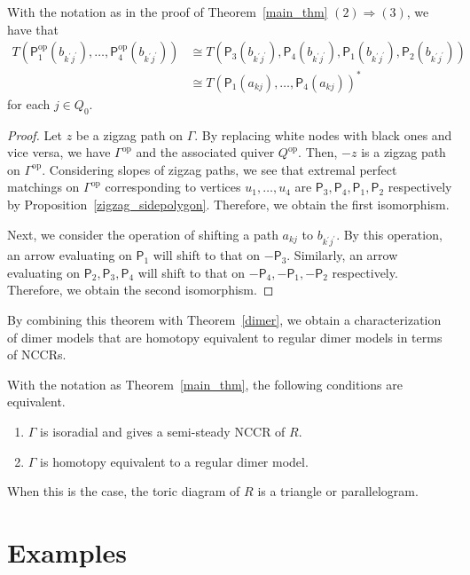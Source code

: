 \documentclass[ALCO,ThmDefs,Unicode]{cedram}
\newcommand{\sfP}{\mathsf{P}}
\DeclareMathOperator{\op}{op}
\begin{document}
\begin{lemm}\label{key_lem}
With the notation as in the proof of Theorem~\ref{main_thm} $(2)\Rightarrow(3)$, we have that
\begin{align*}
T(\sfP^{\op}_1(b_{k^\prime j^\prime}),\dots,\sfP^{\op}_4(b_{k^\prime j^\prime})) &\cong T(\sfP_3(b_{k^\prime j^\prime}),\sfP_4(b_{k^\prime j^\prime}),\sfP_1(b_{k^\prime j^\prime}),\sfP_2(b_{k^\prime j^\prime}))\\
&\cong T(\sfP_1(a_{kj}),\dots,\sfP_4(a_{kj}))^*
\end{align*}
for each $j\in Q_0$.
\end{lemm}

\begin{proof}
Let $z$ be a zigzag path on $\Gamma$. By replacing white nodes with black ones and vice versa, we have $\Gamma^{\op}$ and the associated quiver $Q^{\op}$. Then, $-z$ is a zigzag path on $\Gamma^{\op}$. Considering slopes of zigzag paths, we see that extremal perfect matchings on $\Gamma^{\op}$ corresponding to vertices $u_1,\dots,u_4$ are $\sfP_3, \sfP_4,\sfP_1,\sfP_2$ respectively by Proposition~\ref{zigzag_sidepolygon}. Therefore, we obtain the first isomorphism.

Next, we consider the operation of shifting a path $a_{kj}$ to $b_{k^\prime j^\prime}$. By this operation, an arrow evaluating on $\sfP_1$ will shift to that on $-\sfP_3$. Similarly, an arrow evaluating on $\sfP_2,\sfP_3,\sfP_4$ will shift to that on $-\sfP_4,-\sfP_1,-\sfP_2$ respectively. Therefore, we obtain the second isomorphism.
\end{proof}

By combining this theorem with Theorem~\ref{dimer}, we obtain a characterization of dimer models that are homotopy equivalent to regular dimer models in terms of NCCRs.

\begin{coro}\label{main_cor}
With the notation as Theorem~\ref{main_thm}, the following conditions are equivalent.
\begin{enumerate}[\rm (1)]
\item $\Gamma$ is isoradial and gives a semi-steady NCCR of $R$.
\item $\Gamma$ is homotopy equivalent to a regular dimer model.
\end{enumerate}
When this is the case, the toric diagram of $R$ is a triangle or parallelogram.
\end{coro}


\section{Examples}\label{subsec_ex}
\end{document}
